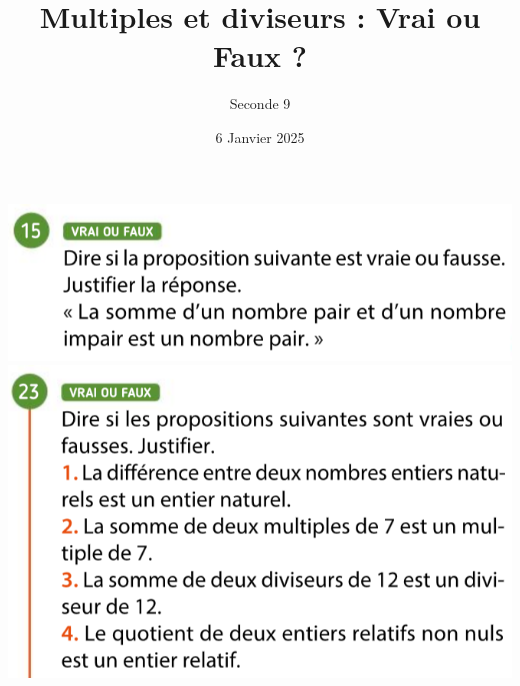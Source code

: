 \documentclass{article}
\title{Multiples et diviseurs : Vrai ou Faux ?}
\author{Seconde 9}
\date{6 Janvier 2025}
\begin{document}
\maketitle
\begin{center}
\includegraphics[width=\textwidth]{Exercice_1.png}
\includegraphics[width=\textwidth]{Exercice_2.png}
\end{center}
\end{document}
